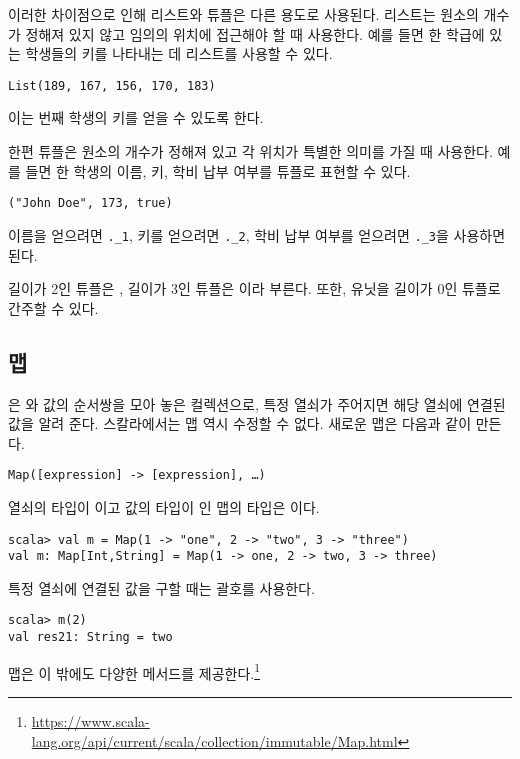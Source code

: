 이러한 차이점으로 인해 리스트와 튜플은 다른 용도로 사용된다. 리스트는 원소의
개수가 정해져 있지 않고 임의의 위치에 접근해야 할 때 사용한다. 예를 들면 한
학급에 있는 학생들의 키를 나타내는 데 리스트를 사용할 수 있다.

\begin{verbatim}
List(189, 167, 156, 170, 183)
\end{verbatim}

이는 번째 학생의 키를 얻을 수 있도록 한다.

한편 튜플은 원소의 개수가 정해져 있고 각 위치가 특별한 의미를 가질 때 사용한다.
예를 들면 한 학생의 이름, 키, 학비 납부 여부를 튜플로 표현할 수 있다.

\begin{verbatim}
("John Doe", 173, true)
\end{verbatim}

이름을 얻으려면 \verb!._1!, 키를 얻으려면 \verb!._2!, 학비 납부 여부를 얻으려면
\verb!._3!을 사용하면
된다.

길이가 2인 튜플은 , 길이가 3인 튜플은 이라 부른다. 또한,
유닛을 길이가 0인 튜플로 간주할 수 있다.

\subsection{맵}

은 와 값의 순서쌍을 모아 놓은 컬렉션으로, 특정 열쇠가 주어지면 해당
열쇠에 연결된 값을 알려 준다. 스칼라에서는 맵 역시 수정할 수 없다. 새로운 맵은
다음과 같이 만든다.

\begin{verbatim}
Map([expression] -> [expression], …)
\end{verbatim}

열쇠의 타입이 이고 값의 타입이 인 맵의 타입은 이다.

\begin{verbatim}
scala> val m = Map(1 -> "one", 2 -> "two", 3 -> "three")
val m: Map[Int,String] = Map(1 -> one, 2 -> two, 3 -> three)
\end{verbatim}

특정 열쇠에 연결된 값을 구할 때는 괄호를 사용한다.

\begin{verbatim}
scala> m(2)
val res21: String = two
\end{verbatim}

맵은 이 밖에도 다양한 메서드를 제공한다.\footnote{\url{https://www.scala-lang.org/api/current/scala/collection/immutable/Map.html}}

